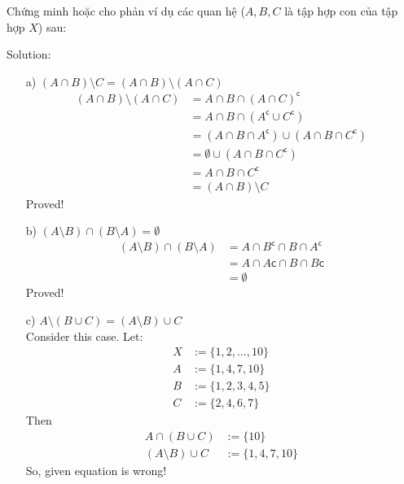 \newpage
\begin{longfbox}
      \begin{bt} \label{pro:practice1.2}
            Chứng minh hoặc cho phản ví dụ các quan hệ ($A,B,C$ là tập hợp con của tập hợp $X$) sau:
      \end{bt}
\end{longfbox}
  
Solution:
\begin{enumerate}
\item[a)] $(A\cap B)\setminus C = (A\cap B)\setminus(A\cap C)$ \\
      \begin{align}
            (A\cap B)\setminus(A\cap C) &= A\cap B\cap (A\cap C)^\mathsf{c} \\
            &= A\cap B\cap (A^\mathsf{c}\cup C^\mathsf{c}) \\
            &= (A\cap B\cap A^\mathsf{c})\cup (A\cap B\cap C^\mathsf{c}) \\
            &= \emptyset \cup (A\cap B\cap C^\mathsf{c}) \\
            &= A\cap B\cap C^\mathsf{c} \\
            &= (A\cap B)\setminus C
      \end{align} 
      Proved!
\item[b)] $(A\setminus B)\cap(B\setminus A) = \emptyset$
      \begin{align}
            (A\setminus B)\cap(B\setminus A) &= A\cap B^\mathsf{c}\cap B \cap A^\mathsf{c} \\
            &= A\cap A\mathsf{c}\cap B\cap B\mathsf{c} \\
            &= \emptyset
      \end{align}
      Proved!
\item[c)] $A\setminus(B\cup C) = (A\setminus B)\cup C$ \\
      Consider this case. Let:
      \begin{align}
            X &:=\{1,2,\dots, 10\} \\
            A &:=\{1,4,7,10\} \\
            B &:=\{1,2,3,4,5\} \\
            C &:=\{2,4,6,7\}
      \end{align}
      Then 
      \begin{align}
            A\cap(B\cup C) &:=\{10\} \\
            (A\setminus B)\cup C &:=\{1,4,7,10\}
      \end{align}
      So, given equation is wrong!

\end{enumerate}
